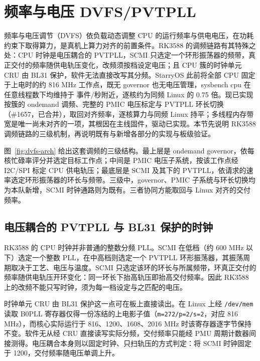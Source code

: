 \section{频率与电压 DVFS/PVTPLL}

频率与电压调节（DVFS）依负载动态调整 CPU 的运行频率与供电电压，在功耗约束下取得算力，是真机上算力对齐的前置条件。RK3588 的调频链路有其特殊之处：CPU 时钟是电压耦合的 PVTPLL，SCMI 只选定一个环形振荡器的频带，真正交付的频率随供电轨压变化，改频须按档设定电压；且 CPU 簇的时钟单元 CRU 由 BL31 保护，软件无法直接改写其分频。StarryOS 此前将全部 CPU 固定于上电时的约 816 MHz 工作点，既无 governor 也无电压管理，sysbench cpu 在任意线程数下均维持于 \nLadderBase{} 事件/秒附近，逐核约为同频 Linux 的 0.75 倍。现已实现按簇的 ondemand 调频、完整的 PMIC 电压标定与 PVTPLL 环长切换（\#1657，已合并），取回对齐频率，逐核算力与同频 Linux 持平；多线程内存带宽是唯一尚未对齐的一项，其根因在主线固件，驱动已实现。本节先说明 RK3588 调频链路的三级机制，再说明既有与新增各部分的实现与板级验证。


图~\ref{fig:dvfs-arch} 给出这套调频的三级结构。最上层是 ondemand governor，依每核忙碌率评分并选定目标工作点；中间是 PMIC 电压子系统，按该工作点经 I2C/SPI 标定 CPU 供电轨压；最底层是 SCMI 及其下的 PVTPLL，依请求的速率选定环形振荡器的环长与频带。三级中，governor、PMIC 子系统与环长切换均为本队新增，SCMI 时钟通路则为既有。三者协同方能取回与 Linux 对齐的交付频率。

\subsection{电压耦合的 PVTPLL 与 BL31 保护的时钟}

RK3588 的 CPU 时钟并非普通的整数分频 PLL。SCMI 在低档（约 600 MHz 以下）选定一个整数 PLL，在中高档则选定一个 PVTPLL 环形振荡器，其振荡周期取决于工艺、电压与温度。SCMI 只选定该环的环长与所属频带，环真正交付的频率随供电轨压开环变化：同一环长下抬高轨压即抬高交付频率。因此 RK3588 上的改频不能只写时钟，须为每一档设定与之匹配的电压。

时钟单元 CRU 由 BL31 保护这一点可在板上直接读出。在 Linux 上经 \texttt{/dev/mem} 读取 B0PLL 寄存器仅得一份冻结的上电影子值（\texttt{m=272/p=2/s=2}，对应 816 MHz），而核心实际运行于 816、1200、1608、2016 MHz 时该寄存器逐字节保持不变。软件无从经 CRU 直接读写实际分频，交付频率只能经 PMU 周期计数器间接测得。电压耦合本身则以固定时钟、只扫轨压的方式判定：将 SCMI 时钟固定于 1200，交付频率随电压单调上升。


